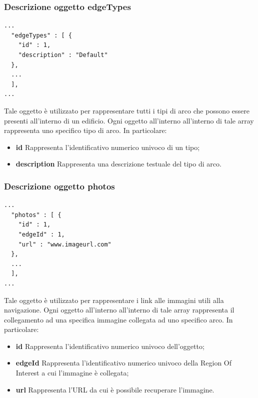 \documentclass[../ManualeSviluppatore.tex]{subfiles}
\begin{document}
	\subsubsection{Descrizione oggetto edgeTypes}
		\begin{lstlisting}
...
  "edgeTypes" : [ {
    "id" : 1,
    "description" : "Default"
  }, 
  ...
  ],
...
		\end{lstlisting}
		Tale oggetto è utilizzato per rappresentare tutti i tipi di arco che possono essere presenti all'interno di un edificio. Ogni oggetto all'interno all'interno di tale array rappresenta uno specifico tipo di arco. In particolare:
		\begin{itemize}
			\item \textbf{id} Rappresenta l'identificativo numerico univoco di un tipo;
			\item \textbf{description} Rappresenta una descrizione testuale del tipo di arco.
		\end{itemize}
		
	\subsubsection{Descrizione oggetto photos}
		\begin{lstlisting}
...
  "photos" : [ {
    "id" : 1,
    "edgeId" : 1,
    "url" : "www.imageurl.com"
  },  
  ...
  ],
...
		\end{lstlisting}
		Tale oggetto è utilizzato per rappresentare i link alle immagini utili alla navigazione. Ogni oggetto all'interno all'interno di tale array rappresenta il collegamento ad una specifica immagine collegata ad uno specifico arco. In particolare:
		\begin{itemize}
			\item \textbf{id} Rappresenta l'identificativo numerico univoco dell'oggetto;
			\item \textbf{edgeId} Rappresenta l'identificativo numerico univoco della Region Of Interest a cui l'immagine è collegata;
			\item \textbf{url} Rappresenta l'URL da cui è possibile recuperare l'immagine.
		\end{itemize}
	
\end{document}
